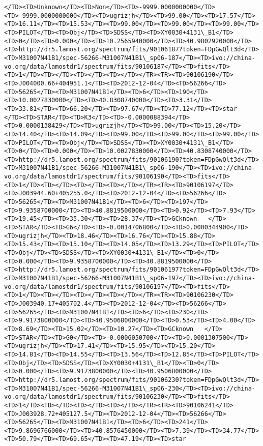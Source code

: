 \documentclass[11pt]{article}
\begin{document}
\begin{Verbatim}[commandchars=\\\{\}]
</TD><TD>Unknown</TD><TD>Non</TD><TD>-9999.0000000000</TD><TD>-9999.0000000000</TD><TD>ugrizjh</TD><TD>99.00</TD><TD>17.57</TD><TD>16.11</TD><TD>15.53</TD><TD>99.00</TD><TD>99.00</TD><TD>99.00</TD><TD>PILOT</TD><TD>Obj</TD><TD>SDSS</TD><TD>XY0030+4131\_B1</TD><TD>0</TD><TD>0.000</TD><TD>10.2565940000</TD><TD>40.9802920000</TD><TD>http://dr5.lamost.org/spectrum/fits/90106187?token=FDpGwQlt3d</TD><TD>M31007N41B1/spec-56266-M31007N41B1\_sp06-187</TD><TD>ivo://china-vo.org/data/lamostdr1/spectrum/fits/90106187</TD><TD>fits</TD><TD>1</TD><TD></TD><TD></TD><TD></TD></TR><TR><TD>90106190</TD><TD>J004000.66+404951.1</TD><TD>2012-12-04</TD><TD>56266</TD><TD>56265</TD><TD>M31007N41B1</TD><TD>6</TD><TD>190</TD><TD>10.0027830000</TD><TD>40.8308740000</TD><TD>3.31</TD><TD>33.81</TD><TD>66.20</TD><TD>97.67</TD><TD>77.12</TD><TD>star      </TD><TD>STAR</TD><TD>K3</TD><TD>-0.0000088394</TD><TD>0.0000138429</TD><TD>ugrizjh</TD><TD>99.00</TD><TD>15.20</TD><TD>14.40</TD><TD>14.09</TD><TD>99.00</TD><TD>99.00</TD><TD>99.00</TD><TD>PILOT</TD><TD>Obj</TD><TD>SDSS</TD><TD>XY0030+4131\_B1</TD><TD>0</TD><TD>0.000</TD><TD>10.0027830000</TD><TD>40.8308740000</TD><TD>http://dr5.lamost.org/spectrum/fits/90106190?token=FDpGwQlt3d</TD><TD>M31007N41B1/spec-56266-M31007N41B1\_sp06-190</TD><TD>ivo://china-vo.org/data/lamostdr1/spectrum/fits/90106190</TD><TD>fits</TD><TD>1</TD><TD></TD><TD></TD><TD></TD></TR><TR><TD>90106197</TD><TD>J003944.60+405255.0</TD><TD>2012-12-04</TD><TD>56266</TD><TD>56265</TD><TD>M31007N41B1</TD><TD>6</TD><TD>197</TD><TD>9.9358700000</TD><TD>40.8819500000</TD><TD>0.92</TD><TD>7.93</TD><TD>19.45</TD><TD>35.30</TD><TD>28.37</TD><TD>GCknown   </TD><TD>STAR</TD><TD>G6</TD><TD>-0.0014706800</TD><TD>0.0000344900</TD><TD>ugrizjh</TD><TD>18.46</TD><TD>16.76</TD><TD>15.88</TD><TD>15.43</TD><TD>15.10</TD><TD>14.05</TD><TD>13.29</TD><TD>PILOT</TD><TD>Obj</TD><TD>SDSS</TD><TD>XY0030+4131\_B1</TD><TD>0</TD><TD>0.000</TD><TD>9.9358700000</TD><TD>40.8819500000</TD><TD>http://dr5.lamost.org/spectrum/fits/90106197?token=FDpGwQlt3d</TD><TD>M31007N41B1/spec-56266-M31007N41B1\_sp06-197</TD><TD>ivo://china-vo.org/data/lamostdr1/spectrum/fits/90106197</TD><TD>fits</TD><TD>1</TD><TD></TD><TD></TD><TD></TD></TR><TR><TD>90106230</TD><TD>J003940.17+405702.4</TD><TD>2012-12-04</TD><TD>56266</TD><TD>56265</TD><TD>M31007N41B1</TD><TD>6</TD><TD>230</TD><TD>9.9173800000</TD><TD>40.9506800000</TD><TD>0.53</TD><TD>4.00</TD><TD>8.69</TD><TD>15.02</TD><TD>10.27</TD><TD>GCknown   </TD><TD>STAR</TD><TD>G0</TD><TD>-0.0006050700</TD><TD>0.0001307500</TD><TD>ugrizjh</TD><TD>17.41</TD><TD>15.95</TD><TD>15.20</TD><TD>14.81</TD><TD>14.55</TD><TD>13.56</TD><TD>12.85</TD><TD>PILOT</TD><TD>Obj</TD><TD>SDSS</TD><TD>XY0030+4131\_B1</TD><TD>0</TD><TD>0.000</TD><TD>9.9173800000</TD><TD>40.9506800000</TD><TD>http://dr5.lamost.org/spectrum/fits/90106230?token=FDpGwQlt3d</TD><TD>M31007N41B1/spec-56266-M31007N41B1\_sp06-230</TD><TD>ivo://china-vo.org/data/lamostdr1/spectrum/fits/90106230</TD><TD>fits</TD><TD>1</TD><TD></TD><TD></TD><TD></TD></TR><TR><TD>90106241</TD><TD>J003928.72+405127.5</TD><TD>2012-12-04</TD><TD>56266</TD><TD>56265</TD><TD>M31007N41B1</TD><TD>6</TD><TD>241</TD><TD>9.8696766000</TD><TD>40.8576450000</TD><TD>7.39</TD><TD>34.77</TD><TD>50.79</TD><TD>69.65</TD><TD>47.19</TD><TD>star 
\end{Verbatim}
\end{document}
